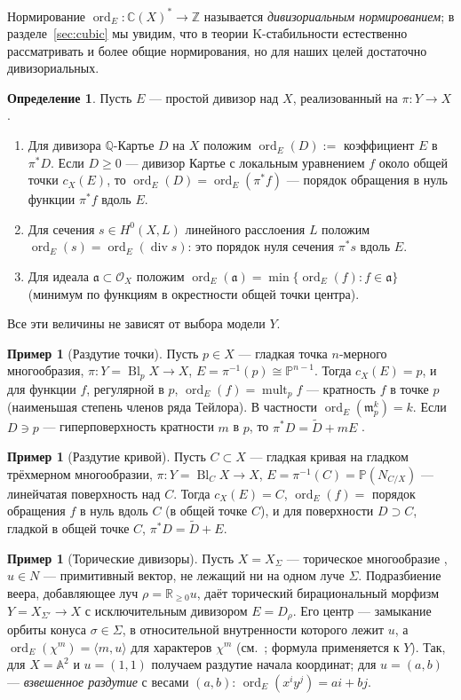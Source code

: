 \documentclass[11pt,a4paper]{article}
\theoremstyle{plain}
\theoremstyle{definition}
\newtheorem{definition}[theorem]{Определение}
\newtheorem{example}[theorem]{Пример}
\theoremstyle{remark}
\renewcommand{\C}{\mathbb{C}}
\newcommand{\Z}{\mathbb{Z}}
\newcommand{\Q}{\mathbb{Q}}
\newcommand{\R}{\mathbb{R}}
\newcommand{\PP}{\mathbb{P}}
\newcommand{\A}{\mathbb{A}}
\newcommand{\cO}{\mathcal{O}}
\newcommand{\mm}{\mathfrak{m}}
\newcommand{\fa}{\mathfrak{a}}
\DeclareMathOperator{\divv}{div}
\DeclareMathOperator{\ord}{ord}
\DeclareMathOperator{\Bl}{Bl}
\DeclareMathOperator{\mult}{mult}
\begin{document}
Нормирование $\ord_E\colon\C(X)^*\to\Z$ называется \emph{дивизориальным нормированием}; в
разделе~\ref{sec:cubic} мы увидим, что в теории K-стабильности естественно рассматривать и более
общие нормирования, но для наших целей достаточно дивизориальных.

\begin{definition}\label{def:ord-E}
Пусть $E$ --- простой дивизор над $X$, реализованный на $\pi\colon Y\to X$.
\begin{enumerate}
\item Для дивизора $\Q$-Картье $D$ на $X$ положим $\ord_E(D):=$ коэффициент $E$ в $\pi^*D$.
Если $D\ge0$ --- дивизор Картье с локальным уравнением $f$ около общей точки $c_X(E)$, то
$\ord_E(D)=\ord_E(\pi^*f)$ --- порядок обращения в нуль функции $\pi^*f$ вдоль $E$.
\item Для сечения $s\in H^0(X,L)$ линейного расслоения $L$ положим $\ord_E(s)=\ord_E(\divv s)$:
это порядок нуля сечения $\pi^*s$ вдоль $E$.
\item Для идеала $\fa\subset\cO_X$ положим $\ord_E(\fa)=\min\{\ord_E(f):f\in\fa\}$ (минимум по
функциям в окрестности общей точки центра).
\end{enumerate}
Все эти величины не зависят от выбора модели $Y$.
\end{definition}

\begin{example}[Раздутие точки]\label{ex:blowup-point-ord}
Пусть $p\in X$ --- гладкая точка $n$-мерного многообразия, $\pi\colon Y=\Bl_pX\to X$,
$E=\pi^{-1}(p)\cong\PP^{n-1}$. Тогда $c_X(E)=p$, и для функции $f$, регулярной в $p$,
$\ord_E(f)=\mult_pf$ --- кратность $f$ в точке $p$ (наименьшая степень членов ряда Тейлора). В
частности $\ord_E(\mm_p^k)=k$. Если $D\ni p$ --- гиперповерхность кратности $m$ в $p$, то
$\pi^*D=\tilde D+mE$ \cite[V.3.6]{Ha}.
\end{example}

\begin{example}[Раздутие кривой]
Пусть $C\subset X$ --- гладкая кривая на гладком трёхмерном многообразии, $\pi\colon Y=\Bl_CX\to X$,
$E=\pi^{-1}(C)=\PP(N_{C/X})$ --- линейчатая поверхность над $C$. Тогда $c_X(E)=C$,
$\ord_E(f)=$ порядок обращения $f$ в нуль вдоль $C$ (в общей точке $C$), и для поверхности
$D\supset C$, гладкой в общей точке $C$, $\pi^*D=\tilde D+E$.
\end{example}

\begin{example}[Торические дивизоры]
Пусть $X=X_\Sigma$ --- торическое многообразие \cite{CLS}, $u\in N$ --- примитивный
вектор, не лежащий ни на одном луче $\Sigma$. Подразбиение веера, добавляющее луч $\rho=\R_{\ge0}u$,
даёт торический бирациональный морфизм $Y=X_{\Sigma'}\to X$ с исключительным дивизором
$E=D_\rho$. Его центр --- замыкание орбиты конуса $\sigma\in\Sigma$, в относительной внутренности
которого лежит $u$, а $\ord_E(\chi^m)=\langle m,u\rangle$ для характеров $\chi^m$ (см.~\cite[\S\,4.1]{CLS};
формула применяется к $Y$). Так, для $X=\A^2$ и $u=(1,1)$ получаем раздутие
начала координат; для $u=(a,b)$ --- \emph{взвешенное раздутие} с весами $(a,b)$:
$\ord_E(x^iy^j)=ai+bj$.
\end{example}
\end{document}
